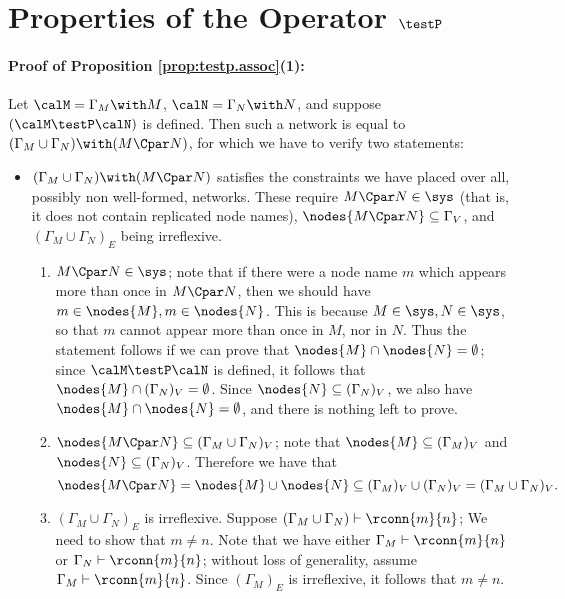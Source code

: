 \documentclass{LMCS}
\begin{document}
\appendix

\section{Properties of the Operator $\testP$}
\label{sec:operator.results}

\paragraph{\textbf{Proof of Proposition \ref{prop:testp.assoc}(1)}:} 
\label{proof:testP.closed}
Let $\calM = \Gamma_M \with M$, $\calN = \Gamma_N \with N$, 
and suppose $(\calM \testP \calN)$ is defined. 
Then such a network is equal to $(\Gamma_M \cup \Gamma_N) 
\with (M \Cpar N)$, for which we have to verify two statements:

\begin{itemize}
\item $(\Gamma_M \cup \Gamma_N) \with (M \Cpar N)$ satisfies the constraints we 
have placed over all, possibly non well-formed, networks. These require 
$M \Cpar N \in \sys$ (that is, it does not contain replicated node names),
$\nodes{M \Cpar N} \subseteq \Gamma_V$, and 
$(\Gamma_M \cup \Gamma_N)_E$ being irreflexive.

\begin{enumerate}

\item $M \Cpar N \in \sys$; note that if there were a node name $m$ which appears more 
than once in $M \Cpar N$, then we should have $m \in \nodes{M}, m \in \nodes{N}$. This is 
because $M \in \sys, N \in \sys$, so that $m$ cannot appear more than once in $M$, nor in $N$. 
Thus the statement follows if we can prove that $\nodes{M} \cap \nodes{N} = \emptyset$; 
since $\calM \testP \calN$ is defined, 
it follows that 
$\nodes{M} \cap (\Gamma_N)_V = \emptyset$. 
Since $\nodes{N} \subseteq (\Gamma_N)_V$,
we also have $\nodes{M} \cap \nodes{N} = \emptyset$, and there is nothing left to prove.

\item $\nodes{M \Cpar N} \subseteq (\Gamma_M \cup \Gamma_N)_V$; 
note that $\nodes{M} \subseteq (\Gamma_M)_V$ and $\nodes{N} \subseteq 
(\Gamma_N)_V$. Therefore we have that
 \[ \nodes{M \Cpar N} = \nodes{M} \cup \nodes{N} \subseteq (\Gamma_M)_V \cup (\Gamma_N)_V = 
 (\Gamma_M \cup \Gamma_N)_V.
 \]


\item $(\Gamma_M \cup \Gamma_N)_E$ is irreflexive. Suppose $(\Gamma_M \cup \Gamma_N) \vdash \rconn{m}{n}$; We need to 
show that $m \neq n$.
Note that we have either $\Gamma_M \vdash \rconn{m}{n}$ or $\Gamma_N \vdash \rconn{m}{n}$; 
without loss of generality, assume $\Gamma_M \vdash \rconn{m}{n}$. Since $(\Gamma_M)_E$ is irreflexive, 
it follows that $m \neq n$.
\end{enumerate}


\end{itemize}
\end{document}
